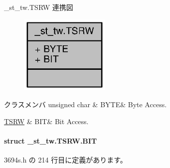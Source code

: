 \+\_\+st\+\_\+tw.\+T\+S\+R\+W 連携図
\nopagebreak
\begin{figure}[H]
\begin{center}
\leavevmode
\includegraphics[width=122pt]{df/d77/union__st__tw_8TSRW__coll__graph}
\end{center}
\end{figure}
\begin{DoxyFields}{クラスメンバ}
unsigned char\label{3694s_8h_ae409eb2ba6eb6801f52763ae370c350e}
&
B\+Y\+T\+E&
Byte Access. \\
\hline

\hyperlink{3694s_8h_d4/dbc/struct__st__tw_8TSRW_8BIT}{T\+S\+R\+W}\label{3694s_8h_adb957fdc8000e1eef04a243f5199aa52}
&
B\+I\+T&
Bit Access. \\
\hline

\end{DoxyFields}
\label{struct__st__tw_8TSRW_8BIT}
\paragraph{struct \+\_\+st\+\_\+tw.\+T\+S\+R\+W.\+B\+I\+T}


 3694s.\+h の 214 行目に定義があります。



